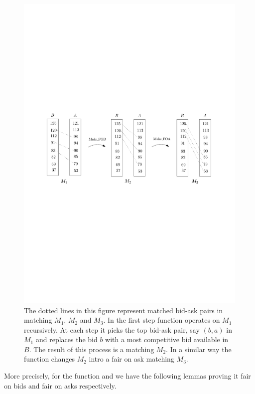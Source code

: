 \documentclass[a4paper,UKenglish,cleveref, autoref]{lipics-v2019}
\begin{document}
\begin{figure}[h!]
\centering
\includegraphics[width=.8\textwidth]{make_fair.pdf}
\caption{The dotted lines in this figure represent  matched bid-ask pairs in  matching $M_1$, $M_2$ and $M_3$. In the first step function  operates on $M_1$ recursively. At each step it picks the top bid-ask pair, say $(b,a)$ in $M_1$ and replaces the bid  $b$ with a most competitive bid available in $B$. The result of this process is a  matching $M_2$. In a similar way the function  changes $M_2$ intro a fair on ask matching $M_3$.  }
\label{fig:fair}
\end{figure}

More precisely, for the function  and  we have the following lemmas proving it fair on bids and fair on asks respectively. 
\begin{lemma}\label{lem:fob}
\end{lemma}

\begin{lemma}\label{lem:foa}
\end{lemma}
\end{document}
